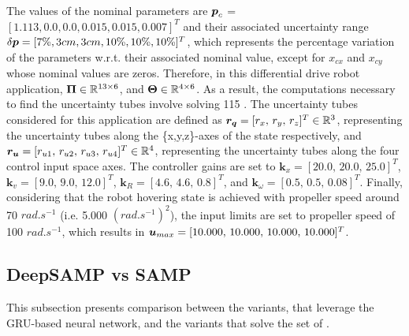 The values of the nominal parameters are $\boldsymbol{p}_{c}$ = $[1.113, 0.0, 0.0, 0.015, 0.015, 0.007]^T$ and their associated uncertainty range $\delta\boldsymbol{p} = [7\%, 3cm, 3cm, 10\%, 10\%, 10\%]^T$, which represents the percentage variation of the parameters w.r.t. their associated nominal value, except for $x_{cx}$ and $x_{cy}$ whose nominal values are zeros.
Therefore, in this differential drive robot application, $\boldsymbol{\Pi} \in \mathbb{R}^{13\times6}$, and $\boldsymbol{\Theta} \in \mathbb{R}^{4\times6}$.
As a result, the computations necessary to find the uncertainty tubes involve solving 115 .
The uncertainty tubes considered for this application are defined as $\boldsymbol{r_q} = [r_x, \, r_y, \, r_z]^T \in \mathbb{R}^3$, representing the uncertainty tubes along the \{x,y,z\}-axes of the state respectively, and $\boldsymbol{r_u} = [r_{u1}, \, r_{u2}, \, r_{u3}, \, r_{u4}]^T \in \mathbb{R}^4$, representing the uncertainty tubes along the four control input space axes.
The controller gains are set to $\boldsymbol{k}_{x} = [20.0, \, 20.0, \, 25.0]^T$, $\boldsymbol{k}_{v}= [9.0, \, 9.0, \, 12.0]^T$, $\boldsymbol{k}_{R}=[4.6, \, 4.6, \, 0.8]^T$, and $\boldsymbol{k}_{\omega}=[0.5, \, 0.5, \, 0.08]^T$.
Finally, considering that the robot hovering state is achieved with propeller speed around 70 $rad.s^{-1}$ (i.e. 5.000 $(rad.s^{-1})^2$), the input limits are set to propeller speed of 100 $rad.s^{-1}$, which results in $\boldsymbol{u}_{max} = [10.000, \, 10.000, \, 10.000, \, 10.000]^T$.

\subsection{DeepSAMP vs SAMP} \label{sec:NNresult}

This subsection presents comparison between the  variants, that leverage the GRU-based neural network, and the  variants that solve the set of .


